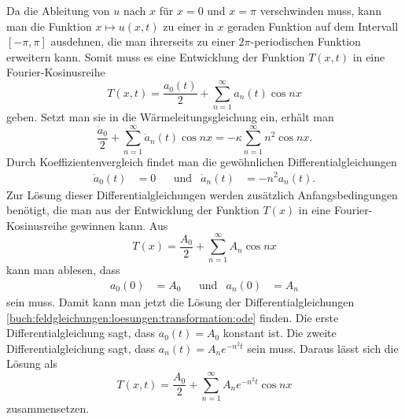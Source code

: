 Da die Ableitung von $u$ nach $x$ für $x=0$ und $x=\pi$ verschwinden
muss, kann man die Funktion $x\mapsto u(x,t)$ zu einer in $x$
geraden Funktion auf dem Intervall $[-\pi,\pi]$ ausdehnen, die
man ihrerseits zu einer $2\pi$-periodischen Funktion erweitern kann.
Somit muss es eine Entwicklung der Funktion $T(x,t)$ in
eine Fourier-Kosinusreihe
\[
T(x,t)
=
\frac{a_0(t)}{2}
+
\sum_{n=1}^\infty
a_n(t) \cos nx
\]
geben.
Setzt man sie in die Wärmeleitungsgleichung ein, erhält man
\[
\frac{\dot{a}_0}{2}
+
\sum_{n=1}^\infty
\dot{a}_n(t) \cos nx
=
-
\kappa
\sum_{n=1}^\infty
n^2
\cos nx.
\]
Durch Koeffizientenvergleich findet man die gewöhnlichen
Differentialgleichungen
\begin{align}
\dot{a}_0(t)&=0
&&\text{und}&
\dot{a}_n(t)&=-n^2 a_n(t).
\label{buch:feldgleichungen:loesungen:transformation:ode}
\end{align}
Zur Lösung dieser Differentialgleichungen werden zusätzlich
Anfangsbedingungen benötigt, die man aus der Entwicklung der
Funktion $T(x)$ in eine Fourier-Kosinusreihe gewinnen kann.
%
Aus 
\[
T(x)
=
\frac{A_0}2
+
\sum_{n=1}^\infty A_n \cos nx
\]
kann man ablesen, dass
\begin{align*}
a_0(0) &= A_0
&&\text{und}&
a_n(0) &= A_n
\end{align*}
sein muss.
Damit kann man jetzt die Lösung der Differentialgleichungen
\eqref{buch:feldgleichungen:loesungen:transformation:ode}
finden.
Die erste Differentialgleichung sagt, dass $a_0(t)=A_0$ konstant ist.
Die zweite Differentialgleichung sagt, dass $a_n(t) = A_ne^{-n^2t}$
sein muss.
Daraus lässt sich die Lösung als
\[
T(x,t)
=
\frac{A_0}{2}
+
\sum_{n=1}^\infty
A_n
e^{-n^2t}
\cos nx
\]
zusammensetzen.

